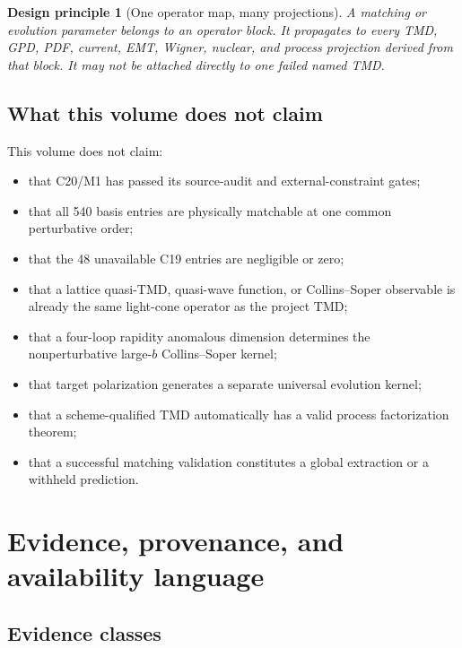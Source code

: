 \documentclass[11pt]{article}
\newtheorem{principle}[definition]{Design principle}
\begin{document}
\begin{principle}[One operator map, many projections]
A matching or evolution parameter belongs to an operator block.  It propagates to every TMD, GPD, PDF, current, EMT, Wigner, nuclear, and process projection derived from that block.  It may not be attached directly to one failed named TMD.
\end{principle}

\subsection{What this volume does not claim}

This volume does not claim:
\begin{itemize}
\item that C20/M1 has passed its source-audit and external-constraint gates;
\item that all 540 basis entries are physically matchable at one common perturbative order;
\item that the 48 unavailable C19 entries are negligible or zero;
\item that a lattice quasi-TMD, quasi-wave function, or Collins--Soper observable is already the same light-cone operator as the project TMD;
\item that a four-loop rapidity anomalous dimension determines the nonperturbative large-\(b\) Collins--Soper kernel;
\item that target polarization generates a separate universal evolution kernel;
\item that a scheme-qualified TMD automatically has a valid process factorization theorem;
\item that a successful matching validation constitutes a global extraction or a withheld prediction.
\end{itemize}

\section{Evidence, provenance, and availability language}
\label{sec:evidence}

\subsection{Evidence classes}
\end{document}
